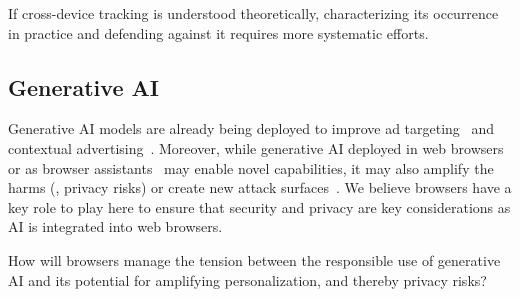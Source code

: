 \begin{opbox}
If cross-device tracking is understood theoretically, characterizing its occurrence in practice and defending against it requires more systematic efforts.
\end{opbox}


\subsection{Generative AI}
Generative AI models are already being deployed to improve ad targeting~\cite{adv-week-genai-targeting} and contextual advertising~\cite{cognitiv2024cookieless}.
%
Moreover, while generative AI deployed in web browsers~\cite{google2024chromeai} or as browser assistants~\cite{vekaria2025big} may enable novel capabilities, it may also amplify the harms (\eg{}, privacy risks) or create new attack surfaces~\cite{mcp-security}. 
%
We believe browsers have a key role to play here to ensure that security and privacy are key considerations as AI is integrated into web browsers.


\begin{opbox}
How will browsers manage the tension between the responsible use of generative AI and its potential for amplifying personalization, and thereby privacy risks?
\end{opbox}



